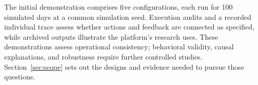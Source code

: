 The initial demonstration comprises five configurations, each run for 100 simulated days at a common simulation seed. Execution audits and a recorded individual trace assess whether actions and feedback are connected as specified, while archived outputs illustrate the platform's research uses. These demonstrations assess operational consistency; behavioral validity, causal explanations, and robustness require further controlled studies. Section~\ref{sec:scope} sets out the designs and evidence needed to pursue those questions.